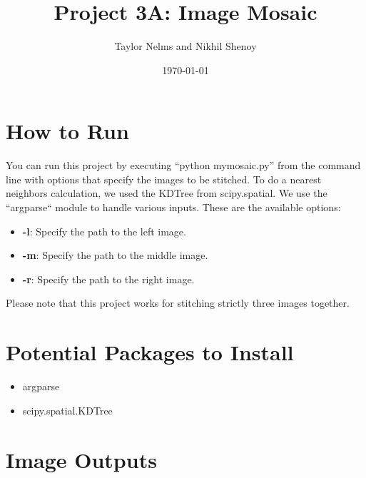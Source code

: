 \documentclass[10pt]{article}
\begin{document}
\title{\vspace{-2.0cm}Project 3A: Image Mosaic}
\author{Taylor Nelms and Nikhil Shenoy}
\date{\today}

\maketitle

\section{How to Run}
	You can run this project by executing ``python mymosaic.py'' from the command line with options that specify the images to be stitched. To do a nearest neighbors calculation, we used the KDTree from scipy.spatial. We use the ``argparse`` module to handle various inputs. These are the available options:

	\begin{itemize}
		\item \textbf{-l}: Specify the path to the left image.
		\item \textbf{-m}: Specify the path to the middle image.
		\item \textbf{-r}: Specify the path to the right image.
	\end{itemize}

	Please note that this project works for stitching strictly three images together.

\section{Potential Packages to Install}

	\begin{itemize}
		\item argparse
		\item scipy.spatial.KDTree
	\end{itemize}

\section{Image Outputs}
\end{document}

